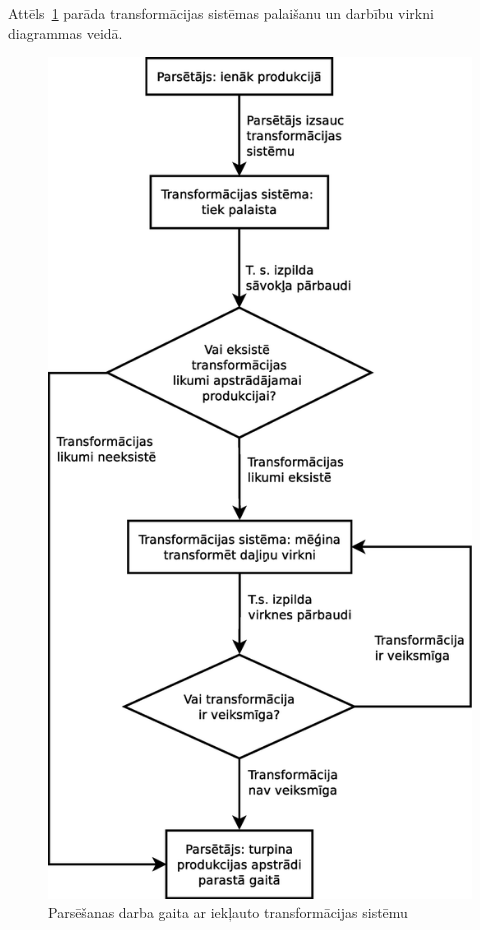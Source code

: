 Attēls~\ref{fig:match_algorithm} parāda transformācijas sistēmas palaišanu un darbību virkni diagrammas veidā.

\begin{figure}[h!]
  \centering
    \includegraphics[scale=0.4]{pictures/match_algorithm}
  \caption{\label{fig:match_algorithm}Parsēšanas darba gaita ar iekļauto transformācijas sistēmu}
\end{figure}

